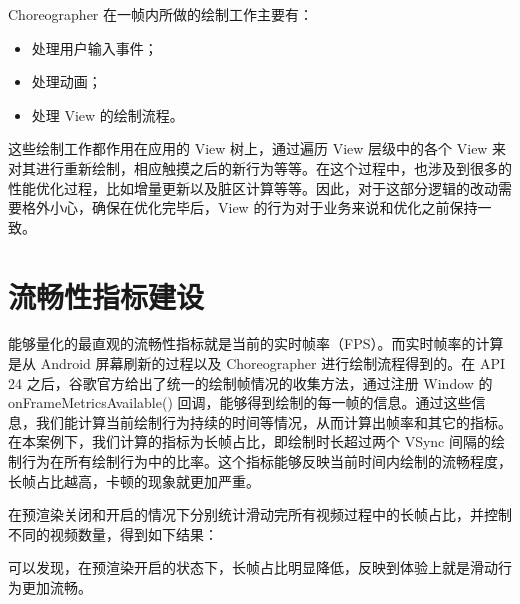 Choreographer 在一帧内所做的绘制工作主要有：

\begin{itemize}
    \item 处理用户输入事件；
    \item 处理动画；
    \item 处理 View 的绘制流程。
\end{itemize}

这些绘制工作都作用在应用的 View 树上，通过遍历 View 层级中的各个 View 来对其进行重新绘制，相应触摸之后的新行为等等。在这个过程中，也涉及到很多的性能优化过程，比如增量更新以及脏区计算等等。因此，对于这部分逻辑的改动需要格外小心，确保在优化完毕后，View 的行为对于业务来说和优化之前保持一致。

\section{流畅性指标建设}

能够量化的最直观的流畅性指标就是当前的实时帧率（FPS）。而实时帧率的计算是从 Android 屏幕刷新的过程以及 Choreographer 进行绘制流程得到的。在 API 24 之后，谷歌官方给出了统一的绘制帧情况的收集方法，通过注册 Window 的 onFrameMetricsAvailable() 回调，能够得到绘制的每一帧的信息。通过这些信息，我们能计算当前绘制行为持续的时间等情况，从而计算出帧率和其它的指标。在本案例下，我们计算的指标为长帧占比，即绘制时长超过两个 VSync 间隔的绘制行为在所有绘制行为中的比率。这个指标能够反映当前时间内绘制的流畅程度，长帧占比越高，卡顿的现象就更加严重。

在预渲染关闭和开启的情况下分别统计滑动完所有视频过程中的长帧占比，并控制不同的视频数量，得到如下结果：



可以发现，在预渲染开启的状态下，长帧占比明显降低，反映到体验上就是滑动行为更加流畅。